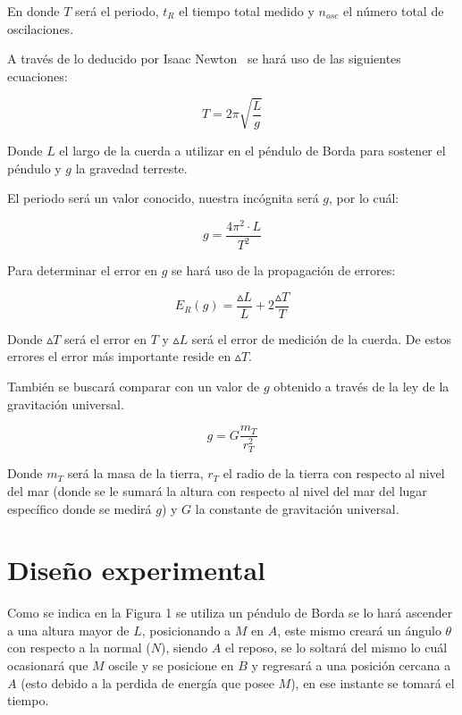 \documentclass[a4paper,twocolumn]{article}
\begin{document}
En donde $T$ será el periodo, $t_{R}$ el tiempo total medido y $n_{osc}$ el número total de oscilaciones.%

A través de lo deducido por Isaac Newton~\cite{b6} se hará uso de las siguientes ecuaciones:

\begin{equation*}
    T=2 \pi \sqrt{\frac{L}{g}}
\end{equation*}

Donde $L$ el largo de la cuerda a utilizar en el péndulo de Borda para sostener el péndulo y $g$ la gravedad terreste.

El periodo será un valor conocido, nuestra incógnita será $g$, por lo cuál:%

\begin{equation} \label{e1}
    g=\frac{4 \pi ^{2} \cdot L}{T^{2}}
\end{equation}

Para determinar el error en $g$ se hará uso de la propagación de errores:\cite{b8}

\begin{equation} \label{e2}
    E_{R}(g)=\frac{\vartriangle L}{L}+2\frac{\vartriangle T}{T}
\end{equation}

Donde $\vartriangle T$ será el error en $T$ y $\vartriangle L$ será el error de medición de la cuerda. De estos errores el error más importante reside en $\vartriangle T$.

También se buscará comparar con un valor de $g$ obtenido a través de la ley de la gravitación universal\cite{b5}.

\begin{equation} \label{e4}
    g=G\frac{m_{T}}{ r_{T}  ^{2}}
\end{equation}

Donde $m_{T}$ será la masa de la tierra\cite{b10}, $r_{T}$\cite{b10} el radio de la tierra con respecto al nivel del mar (donde se le sumará la altura con respecto al nivel del mar del lugar específico donde se medirá $g$) y $G$ la constante de gravitación universal\cite{b1}.

\section{Diseño experimental}

Como se indica en la Figura 1 se utiliza un péndulo de Borda\cite{b1} se lo hará ascender a una altura mayor de $L$, posicionando a $M$ en $A$, este mismo creará un ángulo $\theta$ con respecto a la normal ($N$), siendo $A$ el reposo, se lo soltará del mismo lo cuál ocasionará que $M$ oscile y se posicione en $B$ y regresará a una posición cercana a $A$ (esto debido a la perdida de energía que posee $M$), en ese instante se tomará el tiempo.
\end{document}
